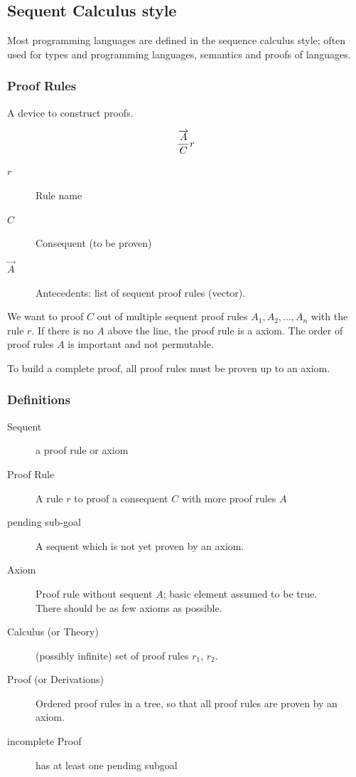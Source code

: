 \subsection{Sequent Calculus style}

Most programming languages are defined in the sequence calculus style; often used for types and programming languages, semantics and proofs of languages.


\subsubsection{Proof Rules}

 A device to construct proofs.
 
 \[
 \frac{\overrightarrow{A}}{C} \boldmath{r}
 \]
 
 \begin{description}
	 	\item[$r$] Rule name
	 	\item[$C$] Consequent (to be proven)
	 	\item[$\vec{A}$] Antecedents: list of sequent proof rules (vector).
 	\end{description}
 	
 
 We want to proof $C$ out of multiple sequent proof rules $A_1, A_2, ..., A_n$ with the rule $r$. If there is no $A$ above the line, the proof rule is a axiom. The order of proof rules $A$ is important and not permutable.
 
 To build a complete proof, all proof rules must be proven up to an axiom.


\subsubsection{Definitions}

\begin{description}
	\item[Sequent] a proof rule or axiom
	\item[Proof Rule] A rule $r$ to proof a consequent $C$ with more proof rules $A$
	\item[pending sub-goal] A sequent which is not yet proven by an axiom.
	\item[Axiom] Proof rule without sequent $A$; basic element assumed to be true. \\
	There should be as few axioms as possible.
	\item[Calculus (or Theory)] (possibly infinite) set of proof rules $r_1$, $r_2$.
	\item[Proof (or Derivations)] Ordered proof rules in a tree, so that all proof rules are proven by an axiom.
	\item[incomplete Proof] has at least one pending subgoal
\end{description}

